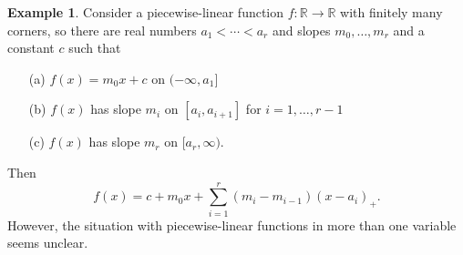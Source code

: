 \documentclass{amsart}
\newcommand{\R}         {{\mathbb{R}}}
\renewcommand{\:}{\colon}
\theoremstyle{definition}
\newtheorem{example}[theorem]{Example}
\begin{document}
\begin{example}\label{eg-pl}
 Consider a piecewise-linear function $f\:\R\to\R$ with finitely many
 corners, so there are real numbers $a_1<\dotsb<a_r$ and slopes
 $m_0,\dotsc,m_r$ and a constant $c$ such that 
 \begin{itemize}
  \item[(a)] $f(x)=m_0x+c$ on $(-\infty,a_1]$
  \item[(b)] $f(x)$ has slope $m_i$ on $[a_i,a_{i+1}]$ for
   $i=1,\dotsc,r-1$
  \item[(c)] $f(x)$ has slope $m_r$ on $[a_r,\infty)$.
 \end{itemize}
 Then 
 \[ f(x) = c + m_0 x + \sum_{i=1}^r (m_i-m_{i-1})(x-a_i)_+. \]
 However, the situation with piecewise-linear functions in more than
 one variable seems unclear.
\end{example}
\end{document}
